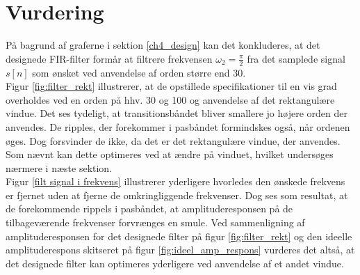 \section{Vurdering}
På bagrund af graferne i sektion \ref{ch4_design} kan det konkluderes, at det designede FIR-filter formår at filtrere frekvensen $\omega_2=\frac{\pi}{2}$ fra det samplede signal $s[n]$ som ønsket ved anvendelse af orden større end $30$. \\
Figur \ref{fig:filter_rekt} illustrerer, at de opstillede specifikationer til en vis grad overholdes ved en orden på hhv. 30 og 100 og anvendelse af det rektangulære vindue. Det ses tydeligt, at transitionsbåndet bliver smallere jo højere orden der anvendes. De ripples, der forekommer i pasbåndet formindskes også, når ordenen øges. Dog forsvinder de ikke, da det er det rektangulære vindue, der anvendes. Som nævnt kan dette optimeres ved at ændre på vinduet, hvilket undersøges nærmere i næste sektion. \\
Figur \ref{filt signal i frekvens} illustrerer yderligere hvorledes den ønskede frekvens er fjernet uden at fjerne de omkringliggende frekvenser. Dog ses som resultat, at de forekommende rippels i pasbåndet, at amplituderesponsen på de tilbageværende frekvenser forvrænges en smule.    
Ved sammenligning af amplituderesponsen for det designede filter på figur \ref{fig:filter_rekt} og den ideelle amplituderespons skitseret på figur \ref{fig:ideel_amp_respons} vurderes det altså, at det designede filter kan optimeres yderligere ved anvendelse af et andet vindue. \\